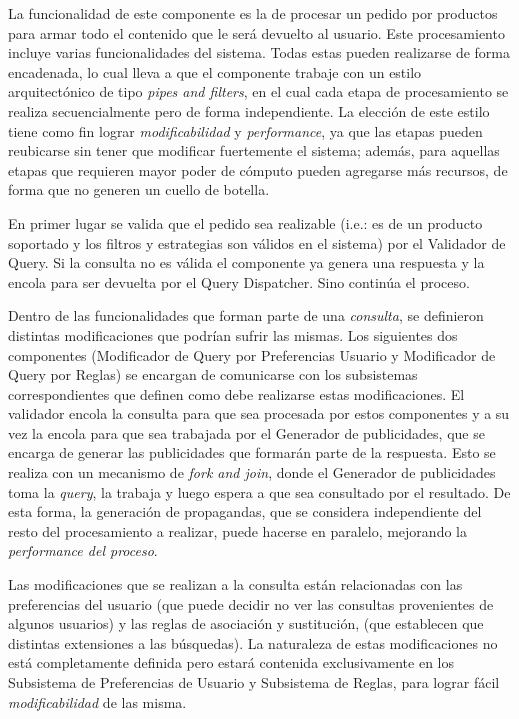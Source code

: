 La funcionalidad de este componente es la de procesar un pedido por productos para armar todo el contenido que le será devuelto al usuario. Este procesamiento incluye varias funcionalidades del sistema. Todas estas pueden realizarse de forma encadenada, lo cual lleva a que el componente trabaje con un estilo arquitectónico de tipo \emph{pipes and filters}, en el cual cada etapa de procesamiento se realiza secuencialmente pero de forma independiente. La elección de este estilo tiene como fin lograr \emph{modificabilidad} y \emph{performance}, ya que las etapas pueden reubicarse sin tener que modificar fuertemente el sistema; además, para aquellas etapas que requieren mayor poder de cómputo pueden agregarse más recursos, de forma que no generen un cuello de botella.

En primer lugar se valida que el pedido sea realizable (i.e.: es de un producto soportado y los filtros y estrategias son válidos en el sistema) por el \textsf{Validador de Query}. Si la consulta no es válida el componente ya genera una respuesta y la encola para ser devuelta por el \textsf{Query Dispatcher}. Sino continúa el proceso.

Dentro de las funcionalidades que forman parte de una \emph{consulta}, se definieron distintas modificaciones que podrían sufrir las mismas. Los siguientes dos componentes (\textsf{Modificador de Query por Preferencias Usuario} y \textsf{Modificador de Query por Reglas}) se encargan de comunicarse con los subsistemas correspondientes que definen como debe realizarse estas modificaciones. El validador encola la consulta para que sea procesada por estos componentes y a su vez la encola para que sea trabajada por el \textsf{Generador de publicidades}, que se encarga de generar las publicidades que formarán parte de la respuesta. Esto se realiza con un mecanismo de \emph{fork and join}, donde el \textsf{Generador de publicidades} toma la \emph{query}, la trabaja y luego espera a que sea consultado por el resultado. De esta forma, la generación de propagandas, que se considera independiente del resto del procesamiento a realizar, puede hacerse en paralelo, mejorando la \emph{performance del proceso}.

Las modificaciones que se realizan a la consulta están relacionadas con las preferencias del usuario (que puede decidir no ver las consultas provenientes de algunos usuarios) y las reglas de asociación y sustitución, (que establecen que distintas extensiones a las búsquedas). La naturaleza de estas modificaciones no está completamente definida pero estará contenida exclusivamente en los \textsf{Subsistema de Preferencias de Usuario} y \textsf{Subsistema de Reglas}, para lograr fácil \emph{modificabilidad} de las misma.

